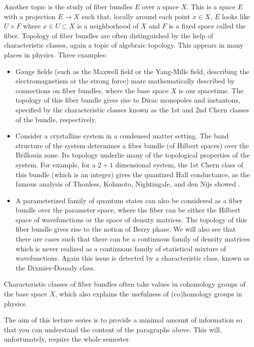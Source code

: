 \documentclass[12pt]{article}
\numberwithin{equation}{section}
\numberwithin{figure}{section}
\theoremstyle{remark}
\begin{document}
Another topic is the study of fiber bundles $E$ over a space $X$.
This is a space $E$ with a projection $E\to X$ such that, locally around each point $x\in X$, 
$E$ looks like $U\times F$ where $x\in U\subset X$ is a neighborhood of $X$ and $F$ is a fixed space called the fiber.
Topology of fiber bundles are often distinguished by the help of characteristic classes,
again a topic of algebraic topology.
This appears in many places in physics. Three examples:
\begin{itemize}
\item Gauge fields (such as the Maxwell field or the Yang-Mills field, describing the electromagnetism or the strong force)
mare mathematically described by connections on fiber bundles, where the base space $X$ is our spacetime.
The topology of this fiber bundle gives rise to Dirac monopoles and instantons,
specified by the characteristic classes known as the 1st and 2nd Chern classes of the bundle, respectively.
\item Consider a crystalline system in a condensed matter setting. The band structure of the system
determines a fiber bundle (of Hilbert spaces) over the Brillouin zone. 
Its topology underlie many of the topological properties of the system.
For example, for a $2+1$ dimensional system, 
the 1st Chern class of this bundle (which is an integer) gives the quantized Hall conductance,
as the famous analysis of Thouless, Kohmoto, Nightingale, and den Nijs showed \cite{Thouless:1982zz}.
\item A parameterized family of quantum states can also be considered as a fiber bundle over the parameter space,
where the fiber can be either the Hilbert space of wavefunctions or the space of density matrices.
The topology of this fiber bundle gives rise to the notion of Berry phase.
We will also see that there are cases such that there can be a continuous family of density matrices
which is never realized as a continuous family of statistical mixture of wavefunctions.
Again this issue is detected by a characteristic class, known as the Dixmier-Douady class.
\end{itemize}
Characteristic classes of fiber bundles often take values in cohomology groups of the base space $X$,
which also explains the usefulness of (co)homology groups in physics.

The aim of this lecture series is to provide a minimal amount of information so that you can understand 
the content of the paragraphs above.
This will, unfortunately, require the whole semester.
\end{document}

